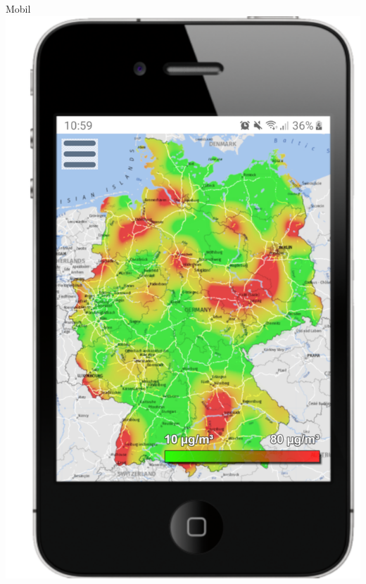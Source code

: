 \begin{frame}{Mobil}
    \centering
    \includegraphics[height=0.8\textheight]{../../media/Startseite-Mobile-Version}
\end{frame}
